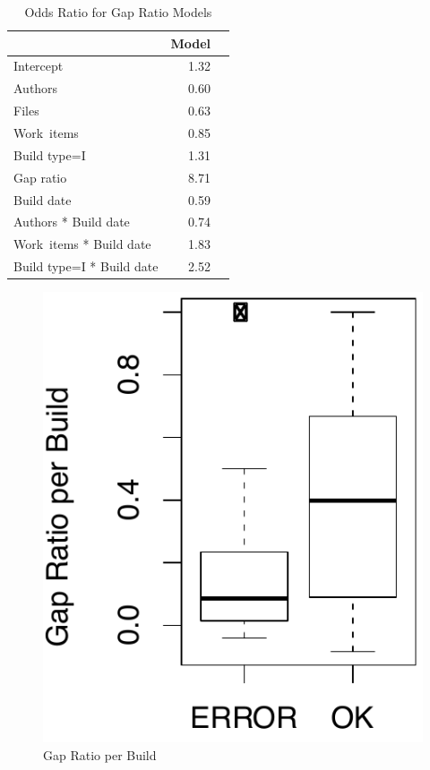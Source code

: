 \begin{table}[t]
\begin{center}
\begin{tabular}{lrr}
  \toprule
 & Model\\ 
  \midrule
Intercept & 1.32 \\ 
  Authors &  0.60 \\ 
  Files &  0.63 \\ 
  Work~items  & 0.85 \\ 
  Build type=I  & 1.31 \\ 
  Gap ratio  & 8.71 \\ 
  Build date  & 0.59 \\ 
  Authors * Build date & 0.74 \\ 
  Work~items * Build date  & 1.83 \\ 
  Build type=I * Build date  & 2.52 \\ 
   \bottomrule
\end{tabular}
\caption{Odds Ratio for Gap Ratio Models}
\label{tab:oddsratio_gapsize}
\end{center}
\end{table}


\begin{figure}[t]
	\centering	
	\includegraphics[width=.5\columnwidth]{figures/boxplot_meangapsize}
	\caption{Gap Ratio per Build}
	\label{fig:gapsizes}
\end{figure}

